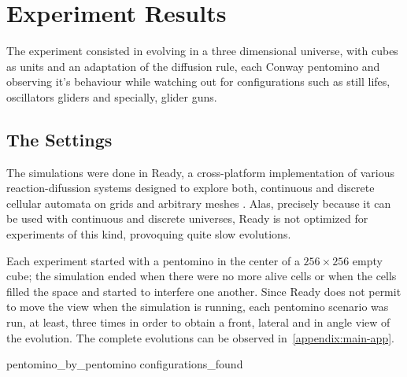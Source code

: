 

\newpage
\section{Experiment Results}

The experiment consisted in evolving in a three dimensional universe, with cubes
as units and an adaptation of the diffusion rule, each Conway pentomino and
observing it's behaviour while watching out for configurations such as still
lifes, oscillators gliders and specially, glider guns.

\subsection{The Settings}
The simulations were done in Ready, a cross-platform implementation of various
reaction-difussion systems designed to explore both, continuous and discrete
cellular automata on grids and arbitrary meshes \cite{ready-golly-gang}.
Alas, precisely because it can be used with continuous and discrete universes,
Ready is not optimized for experiments of this kind, provoquing quite slow
evolutions.

Each experiment started with a pentomino in the center of a $256\times256$ empty
cube; the simulation ended when there were no more alive cells or when the cells
filled the space and started to interfere one another. Since Ready does not
permit to move the view when the simulation is running, each pentomino scenario
was run, at least, three times in order to obtain a front, lateral and in angle
view of the evolution. The complete evolutions can be observed
in~\ref{appendix:main-app}.


{pentomino_by_pentomino}
{configurations_found}
